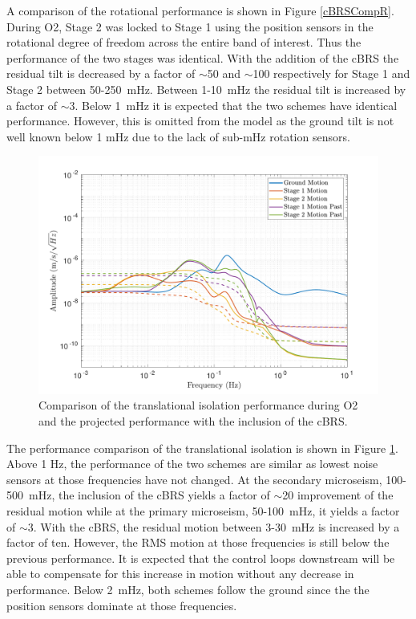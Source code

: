 \documentclass [12pt, proquest]{uwthesis}[2019]
\begin{document}
A comparison of the rotational performance is shown in Figure \ref{cBRSCompR}. During O2, Stage 2 was locked to Stage 1 using the position sensors in the rotational degree of freedom across the entire band of interest. Thus the performance of the two stages was identical. With the addition of the cBRS the residual tilt is decreased by a factor of $\sim$50 and $\sim$100 respectively for Stage 1 and Stage 2 between 50-250~mHz. Between 1-10~mHz the residual tilt is increased by a factor of $\sim$3. Below 1~mHz it is expected that the two schemes have identical performance. However,  this is omitted from the model as the ground tilt is not well known below 1 mHz due to the lack of sub-mHz rotation sensors.


\begin{figure}[!h]
\begin{center}
\includegraphics[width=\textwidth]{cBRS_Model_CompX.pdf}
\caption[Comparison of the translational isolation performance during O2 and the projected performance with the inclusion of the cBRS]{Comparison of the translational isolation performance during O2 and the projected performance with the inclusion of the cBRS.}
\label{cBRSCompX}
\end{center}
\end{figure}

The performance comparison of the translational isolation is shown in Figure \ref{cBRSCompX}. Above 1 Hz, the performance of the two schemes are similar as lowest noise sensors at those frequencies have not changed. At the secondary microseism, 100-500~mHz, the inclusion of the cBRS yields a factor of $\sim$20 improvement of the residual motion while at the primary microseism, 50-100~mHz, it yields a factor of $\sim$3. With the cBRS, the residual motion between 3-30~mHz is increased by a factor of ten. However, the RMS motion at those frequencies is still below the previous performance. It is expected that the control loops downstream will be able to compensate for this increase in motion without any decrease in performance. Below 2~mHz, both schemes follow the ground since the the position sensors dominate at those frequencies.
\end{document}

